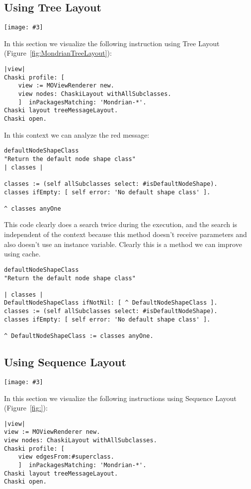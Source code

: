 \documentclass{sig-alternate}
\newcommand{\largefig}[4]{
	\begin{figure*}[#1]
		\centering
		\texttt{[image: \#3]}
		\caption{\label{fig:#3}#4}
	\end{figure*}}
\newcommand{\figref}[1]{Figure~\ref{fig:#1}}
\begin{document}
\subsection{Using Tree Layout}

\largefig{}{1.0}{MondrianTreeLayout}{Mondrian Tree Layout}

In this section we visualize the following instruction using Tree Layout (\figref{MondrianTreeLayout}):
\begin{lstlisting}[language=Smalltalk]
|view|
Chaski profile: [
	view := MOViewRenderer new.
	view nodes: ChaskiLayout withAllSubclasses.
	]  inPackagesMatching: 'Mondrian-*'.
Chaski layout treeMessageLayout.
Chaski open.
\end{lstlisting}


In this context we can analyze the red message:
\begin{lstlisting}[language=Smalltalk]
defaultNodeShapeClass
"Return the default node shape class"
| classes |

classes := (self allSubclasses select: #isDefaultNodeShape).
classes ifEmpty: [ self error: 'No default shape class' ].

^ classes anyOne
\end{lstlisting}

This code clearly does a search twice during the execution, and the search is independent of the context because this method doesn't receive parameters and also doesn't use an instance variable. Clearly this is a method we can improve using cache.
\begin{lstlisting}[language=Smalltalk]
defaultNodeShapeClass
"Return the default node shape class"

| classes |
DefaultNodeShapeClass ifNotNil: [ ^ DefaultNodeShapeClass ].
classes := (self allSubclasses select: #isDefaultNodeShape).
classes ifEmpty: [ self error: 'No default shape class' ].

^ DefaultNodeShapeClass := classes anyOne.

\end{lstlisting}

\subsection{Using Sequence Layout}

\largefig{}{1.0}{MondrianSequenceLayout}{Sequence Tree Layout}
In this section we visualize the following instructions using Sequence Layout (\figref{}):
\begin{lstlisting}[language=Smalltalk]
|view|
view := MOViewRenderer new.
view nodes: ChaskiLayout withAllSubclasses.
Chaski profile: [
	view edgesFrom:#superclass.
	]  inPackagesMatching: 'Mondrian-*'.
Chaski layout treeMessageLayout.
Chaski open.
\end{lstlisting}
\end{document}
